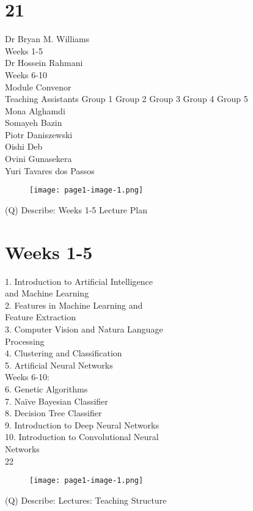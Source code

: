 \documentclass[12pt]{article}
\begin{document}
\section{21}
Dr Bryan M. Williams\\
Weeks 1-5\\
Dr Hossein Rahmani\\
Weeks 6-10\\
Module Convenor\\
Teaching Assistants Group 1 Group 2 Group 3 Group 4 Group 5\\
Mona Alghamdi\\
Somayeh Bazin\\
Piotr Daniszewski\\
Oishi Deb\\
Ovini Gunasekera\\
Yuri Tavares dos Passos\\
\begin{figure}[H]
\texttt{[image: page1-image-1.png]}
\end{figure}
\clearpage
(Q)
Describe: Weeks 1-5
\clearpage
Lecture Plan\\
\section{Weeks 1-5}
1. Introduction to Artificial Intelligence \\
and Machine Learning\\
2. Features in Machine Learning and \\
Feature Extraction\\
3. Computer Vision and Natura Language \\
Processing\\
4. Clustering and Classification\\
5. Artificial Neural Networks\\
Weeks 6-10:\\
6. Genetic Algorithms\\
7. Naïve Bayesian Classifier\\
8. Decision Tree Classifier\\
9. Introduction to Deep Neural Networks\\
10. Introduction to Convolutional Neural \\
Networks\\
22\\
\begin{figure}[H]
\texttt{[image: page1-image-1.png]}
\end{figure}
\clearpage
(Q)
Describe: Lectures:
\clearpage
Teaching Structure\\
\end{document}
